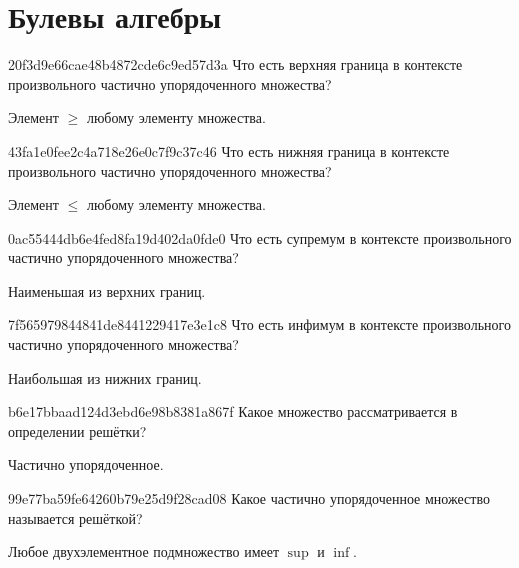 \section{Булевы алгебры}
\begin{note}{20f3d9e66cae48b4872cde6c9ed57d3a}
    Что есть верхняя граница в контексте произвольного частично упорядоченного множества?

    \begin{cloze}{1}
        Элемент \({ \geqslant }\) любому элементу множества.
    \end{cloze}
\end{note}

\begin{note}{43fa1e0fee2c4a718e26e0c7f9c37c46}
    Что есть нижняя граница в контексте произвольного частично упорядоченного множества?

    \begin{cloze}{1}
        Элемент \({ \leqslant }\) любому элементу множества.
    \end{cloze}
\end{note}

\begin{note}{0ac55444db6e4fed8fa19d402da0fde0}
    Что есть супремум в контексте произвольного частично упорядоченного множества?

    \begin{cloze}{1}
        Наименьшая из верхних границ.
    \end{cloze}
\end{note}

\begin{note}{7f565979844841de8441229417e3e1c8}
    Что есть инфимум в контексте произвольного частично упорядоченного множества?

    \begin{cloze}{1}
        Наибольшая из нижних границ.
    \end{cloze}
\end{note}

\begin{note}{b6e17bbaad124d3ebd6e98b8381a867f}
    Какое множество рассматривается в определении решётки?

    \begin{cloze}{1}
        Частично упорядоченное.
    \end{cloze}
\end{note}

\begin{note}{99e77ba59fe64260b79e25d9f28cad08}
    Какое частично упорядоченное множество называется решёткой?

    \begin{cloze}{1}
        Любое двухэлементное подмножество имеет \({ \sup }\) и \({ \inf }\).
    \end{cloze}
\end{note}

